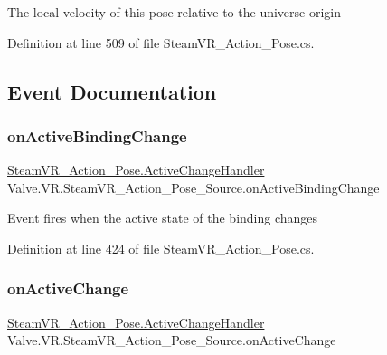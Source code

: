 The local velocity of this pose relative to the universe origin 



Definition at line 509 of file Steam\+V\+R\+\_\+\+Action\+\_\+\+Pose.\+cs.



\subsection{Event Documentation}
\mbox{\label{class_valve_1_1_v_r_1_1_steam_v_r___action___pose___source_a864a6c1c7588f9cb64cf927d0abde8d3}} 
\subsubsection{\texorpdfstring{onActiveBindingChange}{onActiveBindingChange}}
{\footnotesize\ttfamily \mbox{\hyperlink{class_valve_1_1_v_r_1_1_steam_v_r___action___pose_a3861a4b4b8ce246db2cc77e632a7f999}{Steam\+V\+R\+\_\+\+Action\+\_\+\+Pose.\+Active\+Change\+Handler}} Valve.\+V\+R.\+Steam\+V\+R\+\_\+\+Action\+\_\+\+Pose\+\_\+\+Source.\+on\+Active\+Binding\+Change}



Event fires when the active state of the binding changes 



Definition at line 424 of file Steam\+V\+R\+\_\+\+Action\+\_\+\+Pose.\+cs.

\mbox{\label{class_valve_1_1_v_r_1_1_steam_v_r___action___pose___source_a18908de6ad641fca30dff7bdf36c44ad}} 
\subsubsection{\texorpdfstring{onActiveChange}{onActiveChange}}
{\footnotesize\ttfamily \mbox{\hyperlink{class_valve_1_1_v_r_1_1_steam_v_r___action___pose_a3861a4b4b8ce246db2cc77e632a7f999}{Steam\+V\+R\+\_\+\+Action\+\_\+\+Pose.\+Active\+Change\+Handler}} Valve.\+V\+R.\+Steam\+V\+R\+\_\+\+Action\+\_\+\+Pose\+\_\+\+Source.\+on\+Active\+Change}



